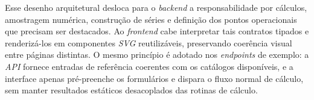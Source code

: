 Esse desenho arquitetural desloca para o \textit{backend} a responsabilidade por cálculos, amostragem numérica, construção de séries e definição dos pontos operacionais que precisam ser destacados. Ao \textit{frontend} cabe interpretar tais contratos tipados e renderizá-los em componentes \textit{SVG} reutilizáveis, preservando coerência visual entre páginas distintas. O mesmo princípio é adotado nos \textit{endpoints} de exemplo: a \textit{API} fornece entradas de referência coerentes com os catálogos disponíveis, e a interface apenas pré-preenche os formulários e dispara o fluxo normal de cálculo, sem manter resultados estáticos desacoplados das rotinas de cálculo.
